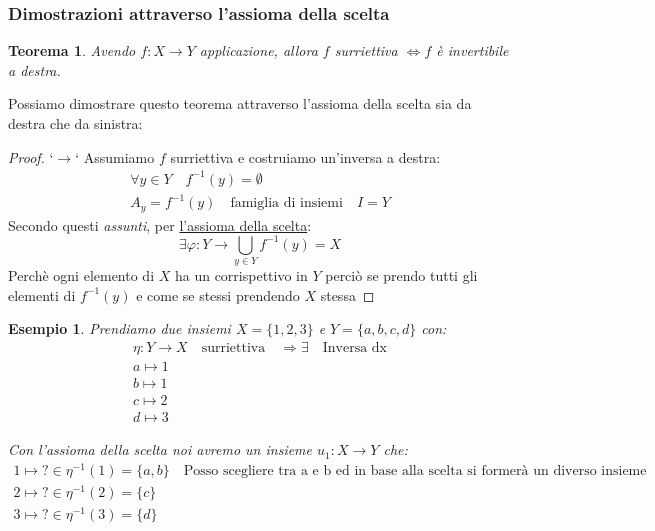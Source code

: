 \documentclass{article}
\newtheorem{exmp}{Esempio}[section]
\newtheorem{theorem}{Teorema}[section]
\theoremstyle{definition}
\begin{document}
\subsubsection{Dimostrazioni attraverso l'assioma della scelta}
\begin{tcolorbox}
\begin{theorem}
        Avendo $ f : X \to Y $ applicazione, allora $ f $ surriettiva $ \Leftrightarrow f $ è invertibile a destra.   
\end{theorem}
\end{tcolorbox}

Possiamo dimostrare questo teorema attraverso l'assioma della scelta sia da destra che da sinistra:
\begin{tcolorbox}
\begin{proof}
       `$ \rightarrow$`  Assumiamo $ f $ surriettiva e costruiamo un'inversa a destra:
        \begin{align*}
                \forall y \in Y \quad f^{-1}(y) = \emptyset \\
                A_y = f^{-1}(y) \quad \mbox{famiglia di insiemi} \quad  I = Y
        \end{align*}
        Secondo questi \textit{assunti}, per \underline{l'assioma della scelta}:
        \begin{equation*}
                \exists \varphi : Y \to \bigcup_{y \in Y}f^{-1}(y) = X 
        \end{equation*}
        Perchè ogni elemento di $ X $ ha un corrispettivo in $ Y $ perciò se prendo tutti gli elementi di $ f^{-1}(y) $ e come se stessi prendendo $ X $ stessa    
\end{proof}
\end{tcolorbox}

\begin{exmp}
        Prendiamo due insiemi $ X = \{1,2,3\} $ e $ Y = \{a,b,c,d\} $ con:
        \begin{align*}
                \eta : Y \to X \quad \mbox{surriettiva} \quad  \Rightarrow \exists \quad \mbox{Inversa dx} \\ 
                a \mapsto 1 \\
                b \mapsto 1 \\
                c \mapsto 2 \\
                d \mapsto 3
        \end{align*}
        
        Con l'assioma della scelta noi avremo un insieme $ u_1 : X \to Y $ che:
        \begin{align*}
                1 \mapsto \mbox{?} \in \eta^{-1}(1) = \{a,b\} \quad \mbox{Posso scegliere tra a e b ed in base alla scelta si formerà un diverso insieme} \\
                2 \mapsto \mbox{?} \in \eta^{-1}(2) = \{c\} \\
                3 \mapsto \mbox{?} \in \eta^{-1}(3) = \{d\} 
        \end{align*}
\end{exmp}
\end{document}
